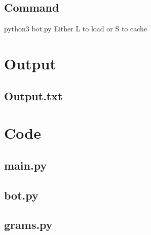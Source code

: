 \documentclass[10pt,titlepage]{article}
\begin{document}
	\subsection*{Command}
	python3 bot.py
	Either L to load or S to cache
	
	\section*{Output}
	
	\subsection*{Output.txt}
	
	
	\clearpage
	
	\section*{Code}
	\subsection*{main.py}
	
	\clearpage
	\subsection*{bot.py}
	
	\clearpage
	\subsection*{grams.py}
	
	
	
	
	
\end{document}
